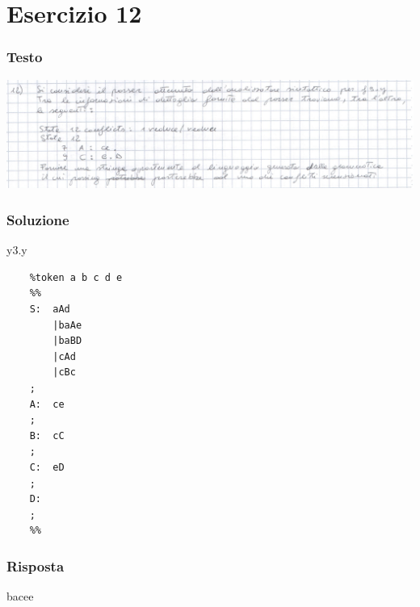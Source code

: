 \chapter{Esercizio 12}

\subsection{Testo}

\begin{center}
    \includegraphics[scale=0.2]{Chapters/Img/12text.png}\\
\end{center} 

\subsection{Soluzione}
y3.y
\begin{lstlisting}
    %token a b c d e
    %%
    S:  aAd
        |baAe 
        |baBD 
        |cAd 
        |cBc
    ;
    A:  ce
    ;
    B:  cC
    ;
    C:  eD
    ;
    D:
    ;
    %%
\end{lstlisting}

\subsection{Risposta}
bacee